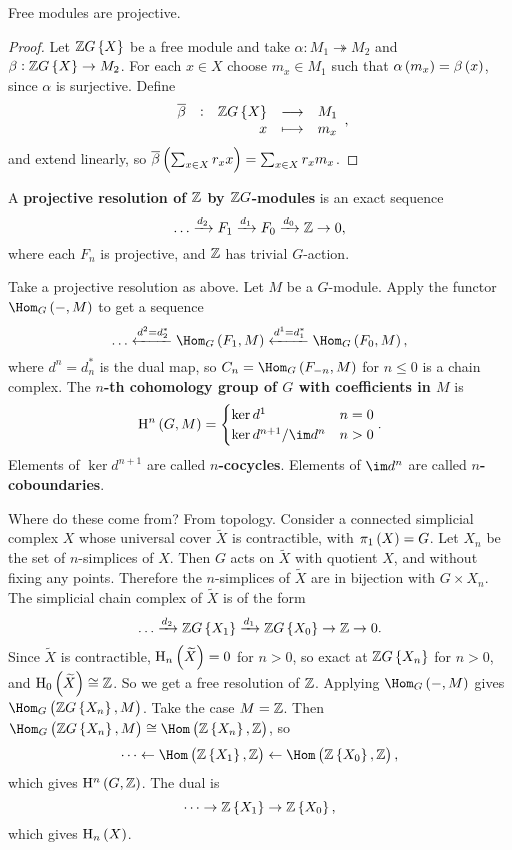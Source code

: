 \begin{proposition}
Free modules are projective.
\end{proposition}

\begin{proof}
Let $ \ZZ G\cbr{X} $ be a free module and take $ \alpha : M_1 \twoheadrightarrow M_2 $ and $ \beta : \ZZ G\cbr{X} \to M_2 $. For each $ x \in X $ choose $ m_x \in M_1 $ such that $ \alpha\br{m_x} = \beta\br{x} $, since $ \alpha $ is surjective. Define
$$ \function[\overline{\beta}]{\ZZ G\cbr{X}}{M_1}{x}{m_x}, $$
and extend linearly, so $ \overline{\beta}\br{\sum_{x \in X} r_xx} = \sum_{x \in X} r_xm_x $.
\end{proof}

\begin{definition}
A \textbf{projective resolution of $ \mathbb{Z} $ by $ \mathbb{Z} G $-modules} is an exact sequence
$$ \dots \xrightarrow{d_2} F_1 \xrightarrow{d_1} F_0 \xrightarrow{d_0} \mathbb{Z} \to 0, $$
where each $ F_n $ is projective, and $ \mathbb{Z} $ has trivial $ G $-action.
\end{definition}

\pagebreak

\begin{definition}
Take a projective resolution as above. Let $ M $ be a $ G $-module. Apply the functor $ \Hom_G\br{-, M} $ to get a sequence
$$ \dots \xleftarrow{d^2 = d_2^*} \Hom_G\br{F_1, M} \xleftarrow{d^1 = d_1^*} \Hom_G\br{F_0, M}, $$
where $ d^n = d_n^* $ is the dual map, so $ C_n = \Hom_G\br{F_{-n}, M} $ for $ n \le 0 $ is a chain complex. The \textbf{$ n $-th cohomology group of $ G $ with coefficients in $ M $} is
$$ \H^n\br{G, M} =
\begin{cases}
\ker d^1 & n = 0 \\
\ker d^{n + 1} / \im d^n & n > 0
\end{cases}.
$$
Elements of $ \ker d^{n + 1} $ are called \textbf{$ n $-cocycles}. Elements of $ \im d^n $ are called \textbf{$ n $-coboundaries}.
\end{definition}


Where do these come from? From topology. Consider a connected simplicial complex $ X $ whose universal cover $ \widetilde{X} $ is contractible, with $ \pi_1\br{X} = G $. Let $ X_n $ be the set of $ n $-simplices of $ X $. Then $ G $ acts on $ \widetilde{X} $ with quotient $ X $, and without fixing any points. Therefore the $ n $-simplices of $ \widetilde{X} $ are in bijection with $ G \times X_n $. The simplicial chain complex of $ \widetilde{X} $ is of the form
$$ \dots \xrightarrow{d_2} \ZZ G\cbr{X_1} \xrightarrow{d_1} \ZZ G\cbr{X_0} \to \ZZ \to 0. $$
Since $ \widetilde{X} $ is contractible, $ \H_n\br{\widetilde{X}} = 0 $ for $ n > 0 $, so exact at $ \ZZ G\cbr{X_n} $ for $ n > 0 $, and $ \H_0\br{\widetilde{X}} \cong \ZZ $. So we get a free resolution of $ \mathbb{Z} $. Applying $ \Hom_G\br{-, M} $ gives $ \Hom_G\br{\ZZ G\cbr{X_n}, M} $. Take the case $ M = \mathbb{Z} $. Then $ \Hom_G\br{\ZZ G\cbr{X_n}, M} \cong \Hom\br{\ZZ\cbr{X_n}, \ZZ} $, so
$$ \dots \gets \Hom\br{\ZZ\cbr{X_1}, \ZZ} \gets \Hom\br{\ZZ\cbr{X_0}, \ZZ}, $$
which gives $ \H^n\br{G, \ZZ} $. The dual is
$$ \dots \to \ZZ\cbr{X_1} \to \ZZ\cbr{X_0}, $$
which gives $ \H_n\br{X} $.


